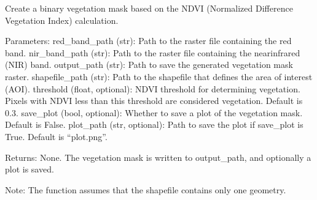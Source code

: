 \documentclass[letterpaper,10pt,english]{sphinxmanual}
\begin{document}
\begin{fulllineitems}
\label{\detokenize{akhdefo_functions:akhdefo_functions.Akhdefo_utils.create_vegetation_mask}}
\pysigstartsignatures
{}
\pysigstopsignatures
\sphinxAtStartPar
Create a binary vegetation mask based on the NDVI (Normalized Difference Vegetation Index) calculation.

\sphinxAtStartPar
Parameters:
\sphinxhyphen{} red\_band\_path (str): Path to the raster file containing the red band.
\sphinxhyphen{} nir\_band\_path (str): Path to the raster file containing the near\sphinxhyphen{}infrared (NIR) band.
\sphinxhyphen{} output\_path (str): Path to save the generated vegetation mask raster.
\sphinxhyphen{} shapefile\_path (str): Path to the shapefile that defines the area of interest (AOI).
\sphinxhyphen{} threshold (float, optional): NDVI threshold for determining vegetation. Pixels with NDVI less than this threshold are considered vegetation. Default is 0.3.
\sphinxhyphen{} save\_plot (bool, optional): Whether to save a plot of the vegetation mask. Default is False.
\sphinxhyphen{} plot\_path (str, optional): Path to save the plot if save\_plot is True. Default is “plot.png”.

\sphinxAtStartPar
Returns:
None. The vegetation mask is written to output\_path, and optionally a plot is saved.

\sphinxAtStartPar
Note:
The function assumes that the shapefile contains only one geometry.

\end{fulllineitems}

\end{document}
